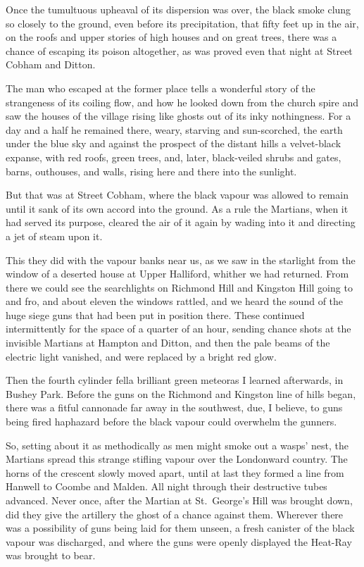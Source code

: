 Once the tumultuous upheaval of its dispersion was over, the black
smoke clung so closely to the ground, even before its
precipitation, that fifty feet up in the air, on the roofs and
upper stories of high houses and on great trees, there was a chance
of escaping its poison altogether, as was proved even that night at
Street Cobham and Ditton.

The man who escaped at the former place tells a wonderful story of
the strangeness of its coiling flow, and how he looked down from
the church spire and saw the houses of the village rising like
ghosts out of its inky nothingness. For a day and a half he
remained there, weary, starving and sun-scorched, the earth under
the blue sky and against the prospect of the distant hills a
velvet-black expanse, with red roofs, green trees, and, later,
black-veiled shrubs and gates, barns, outhouses, and walls, rising
here and there into the sunlight.

But that was at Street Cobham, where the black vapour was allowed
to remain until it sank of its own accord into the ground. As a
rule the Martians, when it had served its purpose, cleared the air
of it again by wading into it and directing a jet of steam upon
it.

This they did with the vapour banks near us, as we saw in the
starlight from the window of a deserted house at Upper Halliford,
whither we had returned. From there we could see the searchlights
on Richmond Hill and Kingston Hill going to and fro, and about
eleven the windows rattled, and we heard the sound of the huge
siege guns that had been put in position there. These continued
intermittently for the space of a quarter of an hour, sending
chance shots at the invisible Martians at Hampton and Ditton, and
then the pale beams of the electric light vanished, and were
replaced by a bright red glow.

Then the fourth cylinder fell\dash{}a brilliant green meteor\dash{}as I
learned afterwards, in Bushey Park. Before the guns on the Richmond
and Kingston line of hills began, there was a fitful cannonade far
away in the southwest, due, I believe, to guns being fired
haphazard before the black vapour could overwhelm the gunners.

So, setting about it as methodically as men might smoke out a
wasps' nest, the Martians spread this strange stifling vapour over
the Londonward country. The horns of the crescent slowly moved
apart, until at last they formed a line from Hanwell to Coombe and
Malden. All night through their destructive tubes advanced. Never
once, after the Martian at St.\ George's Hill was brought down, did
they give the artillery the ghost of a chance against them.
Wherever there was a possibility of guns being laid for them
unseen, a fresh canister of the black vapour was discharged, and
where the guns were openly displayed the Heat-Ray was brought to
bear.

